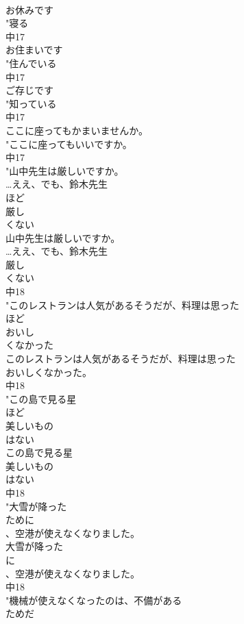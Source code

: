 \documentclass[8pt]{extreport}
\begin{document}
\begin{CJK}{UTF8}{min}
\\	お休みです	
\\	"寝る　
\\	中17
\\	お住まいです	
\\	"住んでいる　
\\	中17
\\	ご存じです	
\\	"知っている　
\\	中17
\\	ここに座ってもかまいませんか。	
\\	"ここに座ってもいいですか。
\\	中17
\\	"山中先生は厳しいですか。
\\	…ええ、でも、鈴木先生
\\	ほど
\\	厳し
\\	くない
\\	山中先生は厳しいですか。
\\	…ええ、でも、鈴木先生
\\	厳し
\\	くない
\\	中18
\\	"このレストランは人気があるそうだが、料理は思った
\\	ほど
\\	おいし
\\	くなかった
\\	このレストランは人気があるそうだが、料理は思った
\\	おいしくなかった。
\\	中18
\\	"この島で見る星
\\	ほど
\\	美しいもの
\\	はない
\\	この島で見る星
\\	美しいもの
\\	はない
\\	中18
\\	"大雪が降った
\\	ために
\\	、空港が使えなくなりました。
\\	大雪が降った
\\	に
\\	、空港が使えなくなりました。
\\	中18
\\	"機械が使えなくなったのは、不備がある
\\	ためだ

\end{CJK}
\end{document}
